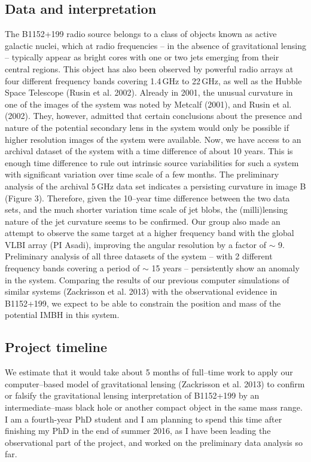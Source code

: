 \documentclass[a4paper, 11pt]{article}
\begin{document}
\subsection{Data and interpretation}
The B1152+199 radio source belongs to a class of objects known as active galactic nuclei, which at radio frequencies -- in the absence of gravitational lensing -- typically appear as bright cores with one or two jets emerging from their central regions. This object has also been observed by powerful radio arrays at four different frequency bands covering 1.4\,GHz to 22\,GHz, as well as the Hubble Space Telescope (Rusin et al. 2002). Already in 2001, the unusual curvature in one of the images of the system was noted by Metcalf (2001), and Rusin et al. (2002). They, however, admitted that certain conclusions about the presence and nature of the potential secondary lens in the system would only be possible if higher resolution images of the system were available. Now, we have access to an archival dataset of the system with a time difference of about 10 years. This is enough time difference to rule out intrinsic source variabilities for such a system with significant variation over time scale of a few months. The preliminary analysis of the archival 5\,GHz data set indicates a persisting curvature in image B (Figure 3). Therefore, given the 10--year time difference between the two data sets, and the much shorter variation time scale of jet blobs, the (milli)lensing nature of the jet curvature seems to be confirmed. Our group also made an attempt to observe the same target at a higher frequency band with the global VLBI array (PI Asadi), improving the angular resolution by a factor of $\sim$ 9. Preliminary analysis of all three datasets of the system -- with 2 different frequency bands covering a period of $\sim$ 15 years -- persistently show an anomaly in the system. Comparing the results of our previous computer simulations of similar systems (Zackrisson et al. 2013) with the observational evidence in B1152+199, we expect to be able to constrain the position and mass of the potential IMBH in this system.

\subsection{Project timeline}
We estimate that it would take about 5 months of full--time work to apply our computer--based model of gravitational lensing (Zackrisson et al. 2013) to confirm or falsify the gravitational lensing interpretation of B1152+199 by an intermediate--mass black hole or another compact object in the same mass range. I am a fourth-year PhD student and I am planning to spend this time after finishing my PhD in the end of summer 2016, as I have been leading the observational part of the project, and worked on the preliminary data analysis so far.
\end{document}
